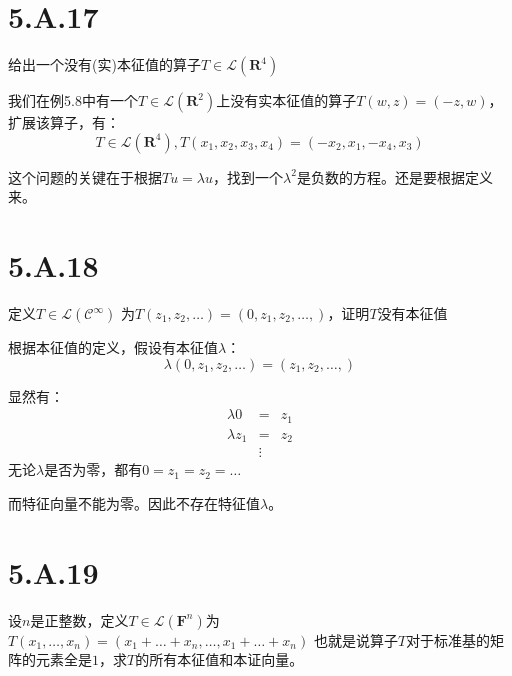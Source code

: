 \documentclass[10pt,a4paper,UTF8]{article}
\begin{document}
\section{5.A.17}
\label{sec:org35c67e2}


\begin{problem}
给出一个没有(实)本征值的算子\(T\in \mathcal{L}(\mathbf{R}^{4})\)
\end{problem}

\begin{answer}
我们在例5.8中有一个\(T\in \mathcal{L}(\mathbf{R}^{2})\)上没有实本征值的算子\(T(w,z) = (-z,w)\)，扩展该算子，有：
\[T\in \mathcal{L}(\mathbf{R}^{4}), T(x_{1},x_{2},x_{3},x_{4}) = (-x_{2},x_{1},-x_{4},x_{3})\]

这个问题的关键在于根据\(Tu = \lambda u\)，找到一个\(\lambda^{2}\)是负数的方程。还是要根据定义来。
\end{answer}
\section{5.A.18}
\label{sec:orgd62ab5b}


\begin{problem}
定义\(T\in \mathcal{L}(\mathcal{C}^{\infty})\) 为\(T(z_{1},z_{2},\ldots ) = (0,z_{1},z_{2},\ldots ,)\)，证明\(T\)没有本征值
\end{problem}

\begin{answer}
根据本征值的定义，假设有本征值\(\lambda\)：
\[\lambda (0,z_{1},z_{2},\ldots ) = (z_{1},z_{2},\ldots ,)\]

显然有：
\begin{eqnarray}
\label{eq:12}
\lambda 0&=&z_{1} \\
\lambda z_{1}&=& z_{2} \\
&\vdots&
\end{eqnarray}
无论\(\lambda\)是否为零，都有\(0 = z_{1}=z_{2} = \ldots\)

而特征向量不能为零。因此不存在特征值\(\lambda\)。
\end{answer}
\section{5.A.19}
\label{sec:org361a5cd}


\begin{problem}
设\(n\)是正整数，定义\(T\in \mathcal{L}(\mathbf{F}^{n})\)为\(T(x_{1},\ldots ,x_{n}) = (x_{1}+\ldots +x_{n},\ldots ,x_{1}+\ldots +x_{n})\) 也就是说算子\(T\)对于标准基的矩阵的元素全是\(1\)，求\(T\)的所有本征值和本证向量。
\end{problem}
\end{document}
